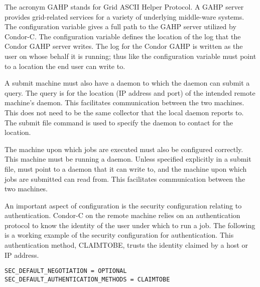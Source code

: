 The acronym GAHP stands for Grid ASCII Helper Protocol.
A GAHP server provides grid-related services for a
variety of underlying middle-ware systems.
The configuration variable 
gives a full path to the GAHP server utilized by Condor-C.
The configuration variable  defines
the location of the log that the Condor GAHP server writes.
The log for the Condor GAHP is written as the user on whose
behalf it is running; thus like  the
 configuration variable must point to a location the end
user can write to.

A submit machine must also have a  daemon to which the
 daemon can submit a query.
The query is for the location (IP address and port)
of the intended remote machine's  daemon.
This facilitates communication between the two machines.
This  does not need to be the same collector
that the local  daemon reports to.
The 
submit file command is used to specify the 
daemon to contact for the location.

The machine upon which jobs are executed 
must also be configured correctly.
This machine must be running a  daemon.
Unless specified explicitly in a submit file, 
 must point to a 
 daemon that it can write to,
and the machine upon which jobs are submitted can read from.
This facilitates communication between the two machines.

An important aspect of configuration is the security 
configuration relating to authentication.
Condor-C on the remote machine relies on an
authentication protocol to
know the identity of the user under which to run a job.
The following is a working example
of the security configuration for authentication.
This authentication method, CLAIMTOBE, 
trusts the identity claimed by a host or IP address.

\footnotesize
\begin{verbatim}
SEC_DEFAULT_NEGOTIATION = OPTIONAL
SEC_DEFAULT_AUTHENTICATION_METHODS = CLAIMTOBE
\end{verbatim}
\normalsize


